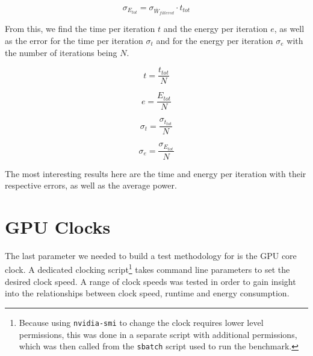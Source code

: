 \begin{equation}
\sigma_{E_{tot}} = \sigma_{\overline{W}_{filtered}} \cdot t_{tot}
\end{equation}

From this, we find the time per iteration \( t \) and the energy per iteration \( e \), as well as the error for the time per iteration \( \sigma_t \) and for the energy per iteration \( \sigma_e \) with the number of iterations being \( N \).

\begin{equation}
t = \frac{t_{tot}}{N}
\end{equation}

\begin{equation}
e = \frac{E_{tot}}{N}
\end{equation}

\begin{equation}
\sigma_t = \frac{\sigma_{t_{tot}}}{N}
\end{equation}

\begin{equation}
\sigma_e = \frac{\sigma_{E_{tot}}}{N}
\end{equation}

The most interesting results here are the time and energy per iteration with their respective errors, as well as the average power.


\section{GPU Clocks}
The last parameter we needed to build a test methodology for is the GPU core clock. A dedicated clocking script\footnote{Because using \texttt{nvidia-smi} to change the clock requires lower level permissions, this was done in a separate script with additional permissions, which was then called from the \texttt{sbatch} script used to run the benchmark.} takes command line parameters to set the desired clock speed. A range of clock speeds was tested in order to gain insight into the relationships between clock speed, runtime and energy consumption.

